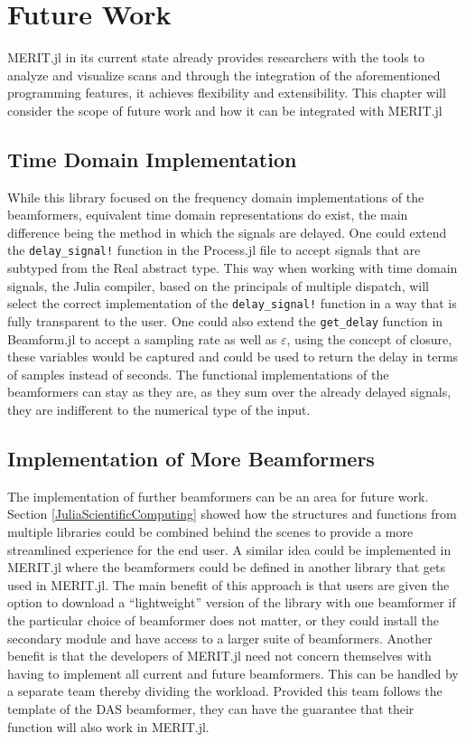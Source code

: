 \setcounter{chapter}{5}
\setcounter{section}{0}
\setcounter{subsection}{0}
\chapter*{Future Work}
MERIT.jl in its current state already provides researchers with the tools to analyze and visualize scans and through the
integration of the aforementioned programming features, it achieves flexibility and extensibility. This chapter will
consider the scope of future work and how it can be integrated with MERIT.jl

\section{Time Domain Implementation}
\label{TDImplementation}
While this library focused on the frequency domain implementations of the beamformers, equivalent time domain
representations do exist, the main difference being the method in which the signals are delayed. One could extend the \lstinline[language=Julia]{delay_signal!} function in the Process.jl file to
accept signals that are subtyped from the Real abstract type. This way when working with time domain signals, the Julia
compiler, based on the principals of multiple dispatch, will select the correct implementation of the
\lstinline[language=Julia]{delay_signal!} function in a way that is fully transparent to the user. One could also extend
the \lstinline[language=Julia]{get_delay} function in Beamform.jl to accept a sampling rate as well as $\varepsilon$,
using the concept of closure, these variables would be captured and could be used to return the delay in terms of
samples instead of seconds. The functional implementations of the beamformers can stay as they are, as they sum over the
already delayed signals, they are indifferent to the numerical type of the input. 

\section{Implementation of More Beamformers}
The implementation of further beamformers can be an area for future work. Section \ref{JuliaScientificComputing} showed
how the structures and functions from multiple libraries could be combined behind the scenes to provide a more
streamlined experience for the end user. A similar idea could be implemented in MERIT.jl where the beamformers could be
defined in another library that gets used in MERIT.jl. The main benefit of this approach is that users are given the
option to download a ``lightweight'' version of the library with one beamformer if the particular choice of beamformer
does not matter, or they could install the secondary module and have access to a larger suite of beamformers. Another
benefit is that the developers of MERIT.jl need not concern themselves with having to implement all current and future
beamformers. This can be handled by a separate team thereby dividing the workload. Provided this team follows the
template of the DAS beamformer, they can have the guarantee that their function will also work in MERIT.jl.

